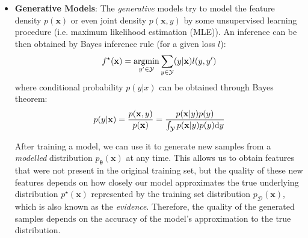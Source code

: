 \begin{itemize}

    \item \textbf{Generative Models}:\label{generative-modelling} The \textit{generative} models try to model the feature density $p(\mathbf{x})$ or even joint density 
        $p(\mathbf{x},y)$ by some unsupervised learning procedure (i.e. maximum likelihood estimation (MLE)). An inference can be then obtained by Bayes 
        inference rule (for a given loss $l$):
        \begin{equation*}
            f^{\star}(\mathbf{x}) = \mathop{\rm argmin}_{y^\prime\in \mathcal{Y}} \sum_{y \in \mathcal{Y}}(y|\mathbf{x})l(y,y^\prime)
        \end{equation*}
        where conditional probability $p(y|x)$ can be obtained through Bayes theorem:
        \begin{equation*}
            p(y|\mathbf{x}) = \frac{p(\mathbf{x},y)}{p(\mathbf{x})} =\frac{p(\mathbf{x}|y)p(y)}{\int_\mathcal{Y} p(\mathbf{x}|y)p(y) \mbox{\rm d}y}
        \end{equation*}

        After training a model, we can use it to generate new samples from a \textit{modelled} distribution $p_\mathbf{\theta}(\mathbf{x})$ at any time. 
        This allows us to obtain features that were not present in the original training set, but the quality of these new features depends on
        how closely our model approximates the true underlying distribution $p^\star(\mathbf{x})$ represented by the training set distribution 
        $p_{\mathcal{D}}(\mathbf{x})$, which is also known as the \textit{evidence}. Therefore, the quality of the generated samples depends on the 
        accuracy of the model's approximation to the true distribution.


\end{itemize}
